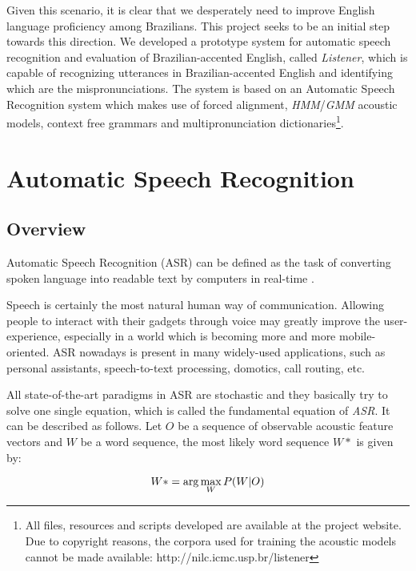 \documentclass[twocolumn]{bmcart}%
\begin{document}
Given this scenario, it is clear that we desperately need to improve English language proficiency among Brazilians. This project seeks to be an initial step towards this direction. We developed a prototype system for automatic speech recognition and evaluation of Brazilian-accented English, called \emph{Listener}, which is capable of recognizing utterances in Brazilian-accented English and identifying which are the mispronunciations. The system is based on an Automatic Speech Recognition system which makes use of forced alignment, \emph{HMM}/\emph{GMM} acoustic models, context free grammars and multipronunciation dictionaries\footnote{All files, resources and scripts developed are available at the project website. Due to copyright reasons, the corpora used for training the acoustic models cannot be made available: http://nilc.icmc.usp.br/listener}.

\section*{Automatic Speech Recognition}\label{sec:speech-recognition}
\subsection*{\textbf{Overview}}

Automatic Speech Recognition (ASR) can be defined as the task of converting spoken language into readable text by computers in real-time \cite{Huang2001}. 

Speech is certainly the most natural human way of communication. Allowing people to interact with their gadgets through voice may greatly improve the user-experience, especially in a world which is becoming more and more mobile-oriented.  ASR nowadays is present in many widely-used applications, such as personal assistants, speech-to-text processing, domotics, call routing, etc.

All state-of-the-art paradigms in ASR are stochastic and they basically try to solve one single equation, which is called the fundamental equation of \emph{ASR}. It can be described as follows. Let $O$ be a sequence of observable acoustic feature vectors and $W$ be a word sequence, the most likely word sequence $W*$ is given by:

\begin{equation}{\label{eq:fund-asr}}
W*= \arg\max_{W}P(W|O)
\end{equation}
\end{document}
